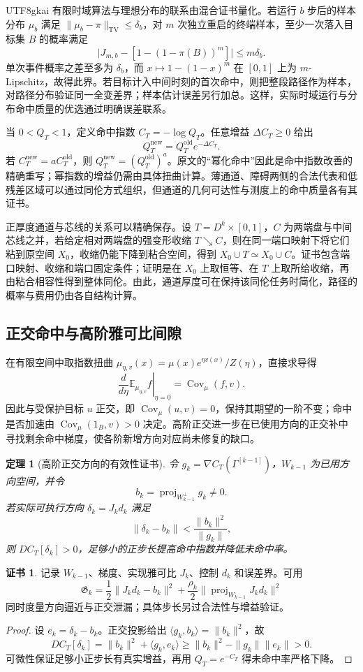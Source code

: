 \documentclass[11pt,a4paper]{article}
\theoremstyle{plain}
\newtheorem{theorem}{定理}[section]
\theoremstyle{definition}
\newtheorem*{certificate}{证书}
\theoremstyle{remark}
\begin{document}
\begin{CJK*}{UTF8}{gkai}
有限时域算法与理想分布的联系由混合证书量化。若运行 $b$ 步后的样本分布 $\mu_b$ 满足 $\|\mu_b-\pi\|_{\mathrm{TV}}\le\delta_b$，对 $m$ 次独立重启的终端样本，至少一次落入目标集 $B$ 的概率满足
\[
 \bigl|J_{m,b}-[1-(1-\pi(B))^m]\bigr|\le m\delta_b.
\]
单次事件概率之差至多为 $\delta_b$，而 $x\mapsto1-(1-x)^m$ 在 $[0,1]$ 上为 $m$-Lipschitz，故得此界。若目标计入中间时刻的首次命中，则把整段路径作为样本，对路径分布验证同一全变差界；样本估计误差另行加总。这样，实际时域运行与分布命中质量的优选通过明确误差联系。

当 $0<Q_T<1$，定义命中指数 $C_T=-\log Q_T$。任意增益 $\Delta C_T\ge0$ 给出
\[
 Q_T^{\mathrm{new}}=Q_T^{\mathrm{old}}e^{-\Delta C_T}.
\]
若 $C_T^{\mathrm{new}}=aC_T^{\mathrm{old}}$，则 $Q_T^{\mathrm{new}}=(Q_T^{\mathrm{old}})^a$。原文的“幂化命中”因此是命中指数改善的精确重写；幂指数的增益仍需由具体扭曲计算。薄通道、障碍两侧的合法代表和低残差区域可以通过同伦方式组织，但通道的几何可达性与测度上的命中质量各有其证书。

正厚度通道与芯线的关系可以精确保存。设 $T=D^k\times[0,1]$，$C$ 为两端盘与中间芯线之并，若给定相对两端盘的强变形收缩 $T\searrow C$，则在同一端口映射下将它们粘到原空间 $X_0$，收缩仍能下降到粘合空间，得到 $X_0\cup T\simeq X_0\cup C$。证书包含端口映射、收缩和端口固定条件；证明是在 $X_0$ 上取恒等、在 $T$ 上取所给收缩，再由粘合相容性得到整体同伦。由此，通道厚度可在保持该同伦任务时简化，路径的概率与费用仍由各自结构计算。

\subsection{正交命中与高阶雅可比间隙}

在有限空间中取指数扭曲 $\mu_{\eta,v}(x)=\mu(x)e^{\eta v(x)}/Z(\eta)$，直接求导得
\[
 \left.\frac{d}{d\eta}\mathbb E_{\mu_{\eta,v}}f\right|_{\eta=0}
 =\operatorname{Cov}_\mu(f,v).
\]
因此与受保护目标 $u$ 正交，即 $\operatorname{Cov}_\mu(u,v)=0$，保持其期望的一阶不变；命中是否加速由 $\operatorname{Cov}_\mu(1_B,v)>0$ 决定。高阶正交进一步在已使用方向的正交补中寻找剩余命中梯度，使各阶新增方向对应尚未修复的缺口。

\begin{theorem}[高阶正交方向的有效性证书]
\label{ss:orthogonal}
令 $g_k=\nabla C_T(\Gamma^{[k-1]})$，$W_{k-1}$ 为已用方向空间，并令
\[
 b_k=\operatorname{proj}_{W_{k-1}^{\perp}}g_k\ne0.
\]
若实际可执行方向 $\delta_k=J_kd_k$ 满足
\[
 \|\delta_k-b_k\|<\frac{\|b_k\|^2}{\|g_k\|},
\]
则 $DC_T[\delta_k]>0$，足够小的正步长提高命中指数并降低未命中率。
\end{theorem}
\begin{certificate}
记录 $W_{k-1}$、梯度、实现雅可比 $J_k$、控制 $d_k$ 和误差界。可用
\[
 \mathfrak G_k=\frac12\|J_kd_k-b_k\|^2
 +\frac{\rho_k}{2}\|\operatorname{proj}_{W_{k-1}}J_kd_k\|^2
\]
同时度量方向逼近与正交泄漏；具体步长另过合法性与增益验证。
\end{certificate}
\begin{proof}
设 $e_k=\delta_k-b_k$。正交投影给出 $\langle g_k,b_k\rangle=\|b_k\|^2$，故
\[
 DC_T[\delta_k]
 =\|b_k\|^2+\langle g_k,e_k\rangle
 \ge\|b_k\|^2-\|g_k\|\|e_k\|>0.
\]
可微性保证足够小正步长有真实增益，再用 $Q_T=e^{-C_T}$ 得未命中率严格下降。
\end{proof}


\end{CJK*}
\end{document}

